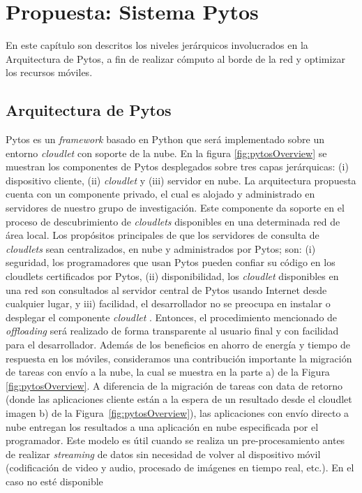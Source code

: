 
\chapter{Propuesta: Sistema Pytos} %

\label{ch:Chapter5} %



En este capítulo son descritos los niveles jerárquicos involucrados en la Arquitectura de Pytos, a fin de realizar cómputo al borde de la red y 
optimizar los recursos móviles. 

\section{Arquitectura de Pytos}
\label{sec:pytosSystem}
Pytos es un \textit{framework} basado en Python que será implementado sobre un entorno \textit{cloudlet} con soporte de la nube. 
En la figura \ref{fig:pytosOverview} se muestran los componentes de Pytos desplegados sobre tres capas jerárquicas: (i) dispositivo cliente, 
(ii) \textit{cloudlet} y (iii) servidor 
en nube. La arquitectura propuesta cuenta con un componente privado, el cual es alojado y administrado en servidores de nuestro grupo 
de investigación. 
Este componente da soporte en el proceso de
descubrimiento de \emph{cloudlets} disponibles en una determinada red de área local. Los propósitos principales de que los servidores 
de consulta de \emph{cloudlets}
sean centralizados, en nube y administrados por Pytos; son: (i) seguridad, los programadores que usan Pytos pueden confiar su código en los cloudlets 
certificados por Pytos, (ii) disponibilidad, los \emph{cloudlet} disponibles en una red son consultados al servidor central de Pytos usando 
Internet desde cualquier lugar, y iii) facilidad, el desarrollador no se preocupa en instalar o desplegar el componente \emph{cloudlet}
. Entonces, el procedimiento mencionado de \emph{offloading} será realizado de forma transparente al usuario final y 
con facilidad para el desarrollador. Además de los beneficios en ahorro de energía y tiempo de respuesta en los móviles, consideramos 
una contribución importante la migración de tareas con envío a la nube, la cual se muestra en la parte a) de la Figura \ref{fig:pytosOverview}. 
A diferencia de la migración de tareas con data de retorno (donde las aplicaciones cliente están a la espera de un resultado desde el cloudlet
imagen b) de la Figura~\ref{fig:pytosOverview}), las aplicaciones con envío directo a nube entregan los resultados a una aplicación en nube 
especificada por el programador. Este modelo es útil cuando se realiza un pre-procesamiento antes de realizar \emph{streaming} de datos sin
necesidad
de volver al dispositivo móvil (codificación de video y audio, procesado de imágenes en tiempo real, etc.). En el caso no esté disponible   

